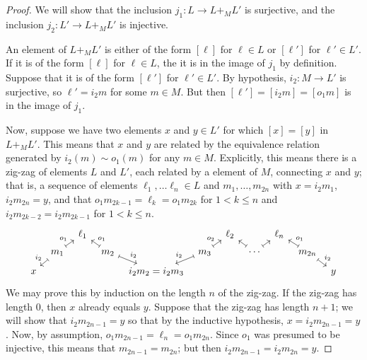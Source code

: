 \documentclass[DynamicalBook]{subfiles}
\begin{document}
    \begin{proof}
      We will show that the inclusion $j_{1} : L \to L +_{M} L'$ is surjective, and the inclusion $j_{2} : L' \to L +_{M} L'$ is injective.

      An element of $L +_{M} L'$ is either of the form $[\ell]$ for $\ell \in L$ or $[\ell
      '] $ for $\ell' \in L'$. If it is of the form $[\ell]$ for $\ell \in L$, the it is in the image of $j_{1}$ by definition. Suppose that it is of the form $[\ell']$ for $\ell' \in L'$. By hypothesis, $i_{2} : M \to L'$ is surjective, so $\ell' = i_{2}m$ for some $m \in M$. But then $[\ell'] = [i_{2}m] = [o_{1}m]$ is in the image of $j_{1}$.

      Now, suppose we have two elements $x$ and $y \in L'$ for which $[x] = [y]$ in $L +_{M} L'$. This means that $x$ and $y$ are related by the equivalence relation generated by $i_{2}(m) \sim o_{1}(m)$ for any $m \in M$. Explicitly, this means there is a zig-zag of elements $L$ and $L'$, each related by a element of $M$, connecting $x$ and $y$; that is, a sequence of elements $\ell_{1}, \ldots \ell_{n} \in L$ and $m_{1}, \ldots, m_{2n}$ with $x = i_{2}m_{1} $, $i_{2}m_{2n} = y$, and that $o_{1}m_{2k -1} = \ell_{k} =  o_{1}m_{2k} $ for $1 < k \leq n$ and $i_{2}m_{2k -2} = i_{2}m_{2k-1}$ for $1 < k \leq n$.
\[
\begin{tikzcd}[sep = tiny]
	&& {\ell_1} &&&& {\ell_2} && {\ell_n} \\
	& {m_1} && {m_2} && {m_3} && \cdots && {m_{2n}} \\
	x &&&& {i_2m_2 = i_2m_3} &&&&&& y
	\arrow["{i_2}"', maps to, from=2-2, to=3-1]
	\arrow["{o_1}", maps to, from=2-2, to=1-3]
	\arrow["{o_1}"', maps to, from=2-4, to=1-3]
	\arrow["{i_2}", maps to, from=2-4, to=3-5]
	\arrow["{i_2}"', maps to, from=2-6, to=3-5]
	\arrow["{o_2}", maps to, from=2-6, to=1-7]
	\arrow[maps to, from=2-8, to=1-7]
	\arrow[maps to, from=2-8, to=1-9]
	\arrow["{o_1}"', maps to, from=2-10, to=1-9]
	\arrow["{i_2}", maps to, from=2-10, to=3-11]
\end{tikzcd}
\]
We may prove this by induction on the length $n$ of the zig-zag. If the zig-zag has length $0$, then $x$ already equals $y$. Suppose that the zig-zag has length $n+1$; we will show that $i_{2}m_{2n-1} = y$ so that by the inductive hypothesis, $x = i_{2}m_{2n-1} = y$. Now, by assumption, $o_{1}m_{2n-1} = \ell_{n} = o_{1}m_{2n}$. Since $o_{1}$ was presumed to be injective, this means that $m_{2n-1} = m_{2n}$; but then $i_{2}m_{2n-1} = i_{2}m_{2n} = y$.
    \end{proof}
\end{document}
